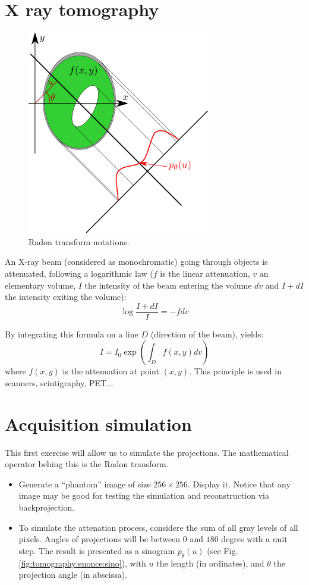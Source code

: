 \def\difficulty{1}

\section{X ray tomography}

\begin{figure}[htbp]
\centering\caption{Radon transform notations.}%
 \includegraphics[width=8cm]{phantom.pdf}%
\end{figure}
An X-ray beam (considered as monochromatic) going through objects is attenuated, following a logarithmic law ($f$ is the linear attenuation, $v$ an elementary volume, $I$ the intensity of the beam entering the volume $dv$ and $I+dI$ the intensity exiting the volume):
$$\log \frac{I+dI}{I} = -fdv$$

By integrating this formula on a line $D$ (direction of the beam), yields:
$$I=I_0 \exp \left( \int_D f(x,y)dv \right) $$
where $f(x,y)$ is the attenuation at point $(x,y)$. This principle is used in scanners, scintigraphy, PET...

\section{Acquisition simulation}
This first exercise will allow us to simulate the projections. The mathematical operator behing this is the Radon transform.
\begin{qbox}
\begin{itemize}
 \item Generate a ``phantom'' image of size $256\times 256$. Display it. Notice that any image may be good for testing the simulation and reconstruction via backprojection.
 \item To simulate the attenation process, considere the sum of all gray levels of all pixels. Angles of projections will be between $0$ and $180$ degres with a unit step. The result is presented as a sinogram $p_\theta(u)$ (see Fig. \ref{fig:tomography:enonce:sino}), with $u$ the length (in ordinates), and $\theta$ the projection angle (in abscissa).
\end{itemize}
\end{qbox}

